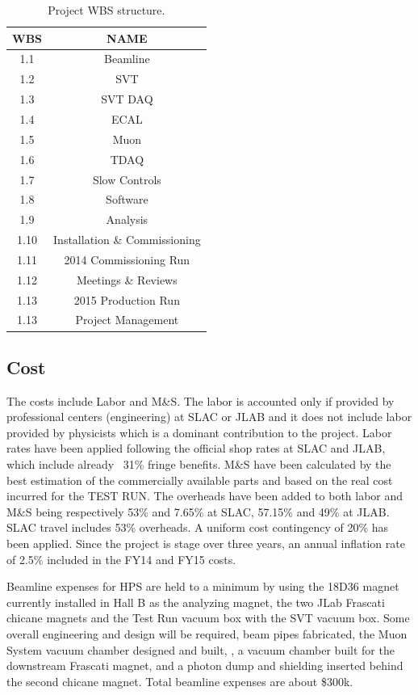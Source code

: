 \begin{table}[htdp]
\caption{Project WBS structure.}
\begin{center}
\begin{tabular}{|c|c|}
\hline
WBS& NAME \\
\hline\hline
1.1 & Beamline \\
\hline
1.2 & SVT \\
\hline
1.3 & SVT DAQ \\
\hline
1.4 & ECAL \\
\hline
1.5 & Muon \\
\hline
1.6 & TDAQ \\
\hline
1.7 & Slow Controls \\
\hline
1.8 & Software \\
\hline
1.9 & Analysis \\
\hline
1.10 & Installation \& Commissioning \\
\hline
1.11 & 2014 Commissioning Run \\
\hline
1.12 & Meetings \& Reviews \\
\hline
1.13 & 2015 Production Run \\
1.13 & Project Management  \\
\hline
\hline
\end{tabular}
\end{center}
\label{tb:wbs}
\end{table}%

\subsection{Cost}

The costs include Labor and M\&S. The labor is accounted only if provided by professional centers (engineering) at SLAC or JLAB and it does not include labor provided by physicists which is a dominant contribution to the  project. Labor rates have been applied following the official shop rates at SLAC and JLAB, which include already ~31\% fringe benefits. M\&S have been calculated by the best estimation of the commercially available parts and based on the real cost incurred for the TEST RUN. The overheads have been added to both labor and M\&S being respectively 53\% and 7.65\% at SLAC, 57.15\% and 49\% at JLAB. SLAC travel includes 53\% overheads. A uniform cost contingency of 20\% has been applied. Since the project is stage over three years, an annual inflation rate of 2.5\%  included in the FY14 and FY15 costs.

Beamline expenses for HPS are held to a minimum by using the 18D36 magnet currently installed in Hall B as the analyzing magnet, the two JLab Frascati chicane magnets and the Test Run vacuum box with the SVT vacuum box.  Some overall engineering and design will be required, beam pipes fabricated, the Muon System vacuum chamber designed and built, , a vacuum chamber built for the downstream Frascati magnet, and a photon dump and shielding inserted behind the second chicane magnet. Total beamline expenses are about \$300k.

